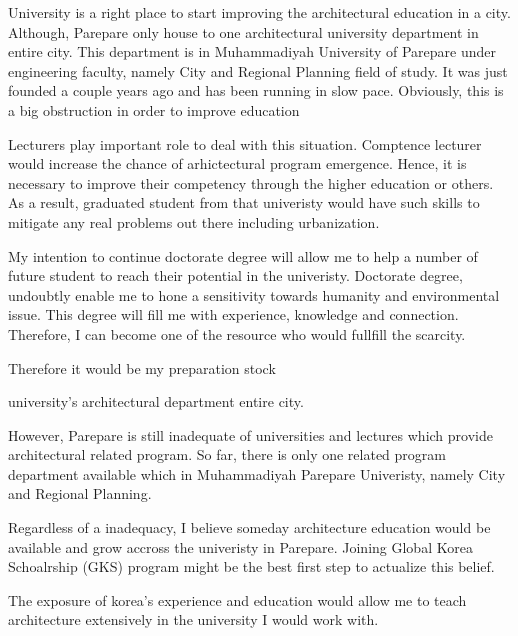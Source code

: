 \documentclass[11pt]{simart} %
\begin{document}
University is a right place to start improving the architectural education in a city.
Although, Parepare only house to one architectural university department in entire city.
This department is in Muhammadiyah University of Parepare under engineering faculty, namely City and Regional Planning field of study.
It was just founded a couple years ago and has been running in slow pace. Obviously, this is a big obstruction in order to improve education

Lecturers play important role to deal with this situation.
Comptence lecturer would increase the chance of arhictectural program emergence.
Hence, it is necessary to improve their competency through the higher education or others.
As a result, graduated student from that univeristy would have such skills to mitigate any real problems out there including urbanization.


My intention to continue doctorate degree will allow me to help a number of future student to reach their potential in the univeristy.
Doctorate degree, undoubtly enable me to hone a sensitivity towards humanity and environmental issue. This degree will fill me with experience, knowledge and connection.
Therefore, I can become one of the resource who would fullfill the scarcity.

Therefore it would be my preparation stock


university's architectural department  entire city.

However, Parepare is still inadequate of universities and lectures which provide architectural related program. So far, there is only one related program department available which in Muhammadiyah Parepare Univeristy, namely City and Regional Planning.



Regardless of a inadequacy, I believe someday architecture education would be available and grow accross the univeristy in Parepare.
Joining Global Korea Schoalrship (GKS) program might be the best first step to actualize this belief.

The exposure of korea's experience and education would allow me to teach architecture extensively in the university I would work with.
\end{document}
